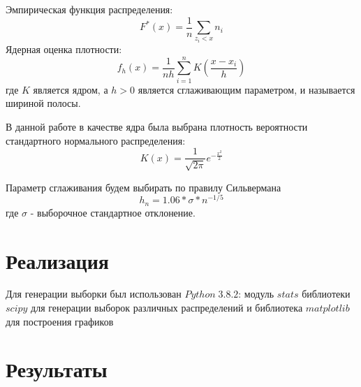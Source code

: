 \documentclass[a4]{article}
\begin{document}
Эмпирическая функция распределения:
\begin{equation}
F^{*}(x) = \dfrac{1}{n}\sum\limits_{z_{i}<x}n_{i}
\end{equation}
Ядерная оценка плотности:
\begin{equation}
f_h(x) = \frac{1}{nh}\sum\limits_{i=1}^nK\left(\frac{x-x_i}{h}\right)\label{eqn:art}
\end{equation}
где $K$ является ядром, а $h>0$ является сглаживающим параметром, и называется шириной полосы.

В данной работе в качестве ядра была выбрана плотность вероятности стандартного нормального распределения:
\begin{equation}
K(x) = \frac{1}{\sqrt{2\pi}}e^{-\frac{x^2}{2}}
\end{equation}

Параметр сглаживания будем выбирать по правилу Сильвермана
\begin{equation}
h_{n} = 1.06*\sigma*n^{-1/5}
\end{equation}
где $ \sigma $ - выборочное стандартное отклонение.

\section{Реализация}
Для генерации выборки был использован $Python\;3.8.2$: модуль $stats$ библиотеки $scipy$ для генерации выборок различных распределений и библиотека $matplotlib$ для построения графиков

\newpage
\section{Результаты}
\end{document}
